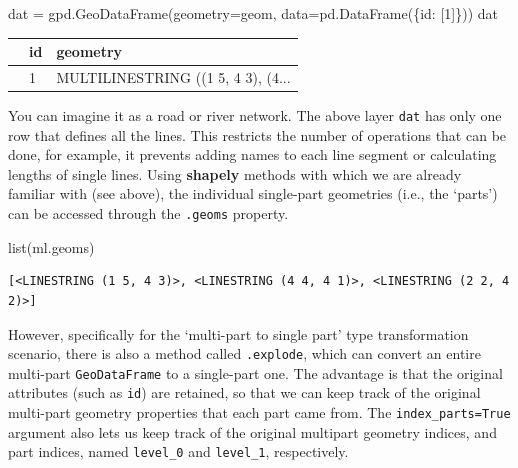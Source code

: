 \documentclass[
  letterpaper,
]{krantz}
\newenvironment{Shaded}{\begin{snugshade}}{\end{snugshade}}
\newcommand{\BuiltInTok}[1]{\textcolor[rgb]{0.00,0.23,0.31}{#1}}
\newcommand{\DecValTok}[1]{\textcolor[rgb]{0.68,0.00,0.00}{#1}}
\newcommand{\NormalTok}[1]{\textcolor[rgb]{0.00,0.23,0.31}{#1}}
\newcommand{\OperatorTok}[1]{\textcolor[rgb]{0.37,0.37,0.37}{#1}}
\newcommand{\StringTok}[1]{\textcolor[rgb]{0.13,0.47,0.30}{#1}}
\begin{document}
\begin{Shaded}
\begin{Highlighting}[]
\NormalTok{dat }\OperatorTok{=}\NormalTok{ gpd.GeoDataFrame(geometry}\OperatorTok{=}\NormalTok{geom, data}\OperatorTok{=}\NormalTok{pd.DataFrame(\{}\StringTok{\textquotesingle{}id\textquotesingle{}}\NormalTok{: [}\DecValTok{1}\NormalTok{]\}))}
\NormalTok{dat}
\end{Highlighting}
\end{Shaded}

\begin{longtable}[]{@{}lll@{}}
\toprule\noalign{}
& id & geometry \\
\midrule\noalign{}
\endhead
\bottomrule\noalign{}
\endlastfoot
0 & 1 & MULTILINESTRING ((1 5, 4 3), (4... \\
\end{longtable}

You can imagine it as a road or river network. The above layer
\texttt{dat} has only one row that defines all the lines. This restricts
the number of operations that can be done, for example, it prevents
adding names to each line segment or calculating lengths of single
lines. Using \textbf{shapely} methods with which we are already familiar
with (see above), the individual single-part geometries (i.e., the
`parts') can be accessed through the \texttt{.geoms} property.

\begin{Shaded}
\begin{Highlighting}[]
\BuiltInTok{list}\NormalTok{(ml.geoms)}
\end{Highlighting}
\end{Shaded}

\begin{verbatim}
[<LINESTRING (1 5, 4 3)>, <LINESTRING (4 4, 4 1)>, <LINESTRING (2 2, 4 2)>]
\end{verbatim}

However, specifically for the `multi-part to single part' type
transformation scenario, there is also a method called
\texttt{.explode}, which can convert an entire multi-part
\texttt{GeoDataFrame} to a single-part one. The advantage is that the
original attributes (such as \texttt{id}) are retained, so that we can
keep track of the original multi-part geometry properties that each part
came from. The \texttt{index\_parts=True} argument also lets us keep
track of the original multipart geometry indices, and part indices,
named \texttt{level\_0} and \texttt{level\_1}, respectively.
\end{document}
